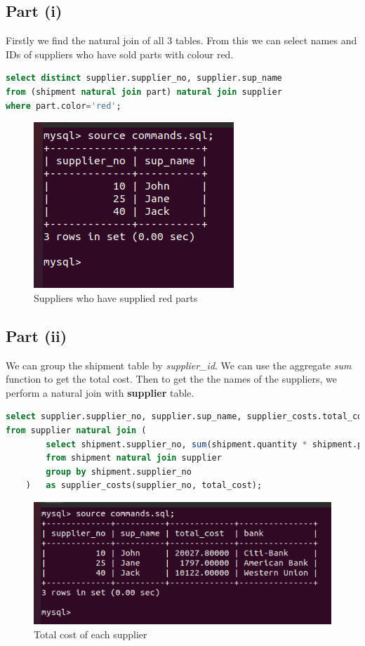 \documentclass{article}
\begin{document}
\subsection{Part (i)}
Firstly we find the natural join of all 3 tables. From this we can select 
names and IDs of suppliers who have sold parts with colour red.
\begin{lstlisting}[language=sql]
select distinct supplier.supplier_no, supplier.sup_name
from (shipment natural join part) natural join supplier
where part.color='red';
\end{lstlisting}
\begin{figure}[!ht]
  \begin{center}
  \includegraphics[scale=1]{red_supply.png}
  \caption{Suppliers who have supplied red parts}
  \end{center}
\end{figure}

\subsection{Part (ii)}
We can group the shipment table by \textit{supplier\_id}. We can use the
aggregate \textit{sum} function to get the total cost. Then to get the
the names of the suppliers, we perform a natural join with \textbf{supplier} table.
\begin{lstlisting}[language=sql]
select supplier.supplier_no, supplier.sup_name, supplier_costs.total_cost, supplier.bank
from supplier natural join (
        select shipment.supplier_no, sum(shipment.quantity * shipment.price)
        from shipment natural join supplier
        group by shipment.supplier_no
    ) 	as supplier_costs(supplier_no, total_cost);
\end{lstlisting}
\begin{figure}[!ht]
  \begin{center}
  \includegraphics[scale=0.57]{cost_per_supplier.png}
  \caption{Total cost of each supplier}
  \end{center}
\end{figure}
\end{document}
